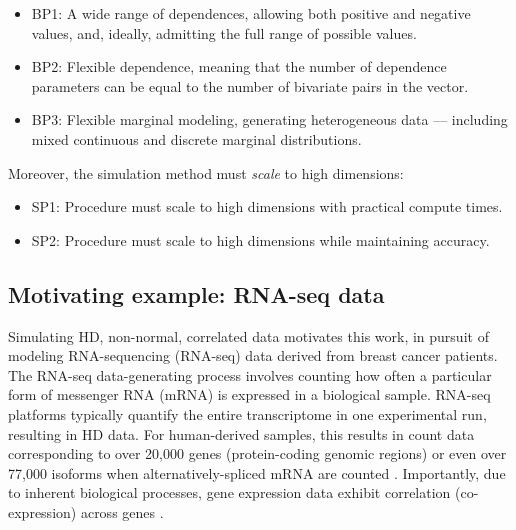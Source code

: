 \documentclass[
]{jss}
\providecommand{\tightlist}{%
  \setlength{\itemsep}{0pt}\setlength{\parskip}{0pt}}
\begin{document}

\begin{itemize}
\tightlist
\item
  BP1: A wide range of dependences, allowing both positive and negative values, and, ideally, admitting the full range of possible values.
\item
  BP2: Flexible dependence, meaning that the number of dependence parameters can be equal to the number of bivariate pairs in the vector.
\item
  BP3: Flexible marginal modeling, generating heterogeneous data --- including mixed continuous and discrete marginal distributions.
\end{itemize}


Moreover, the simulation method must \emph{scale} to high dimensions:


\begin{itemize}
\tightlist
\item
  SP1: Procedure must scale to high dimensions with practical compute times.
\item
  SP2: Procedure must scale to high dimensions while maintaining accuracy.
\end{itemize}


\hypertarget{motivating-example-rna-seq-data}{%
\subsection{Motivating example: RNA-seq data}\label{motivating-example-rna-seq-data}}

Simulating HD, non-normal, correlated data motivates this work, in pursuit of modeling RNA-sequencing (RNA-seq) data \citep{Wang2009b, Conesa2016b} derived from breast cancer patients. The RNA-seq data-generating process involves counting how often a particular form of messenger RNA (mRNA) is expressed in a biological sample. RNA-seq platforms typically quantify the entire transcriptome in one experimental run, resulting in HD data. For human-derived samples, this results in count data corresponding to over 20,000 genes (protein-coding genomic regions) or even over 77,000 isoforms when alternatively-spliced mRNA are counted \citep{Schissler2019}. Importantly, due to inherent biological processes, gene expression data exhibit correlation (co-expression) across genes \citep{BE07, Schissler2018}.
\end{document}
